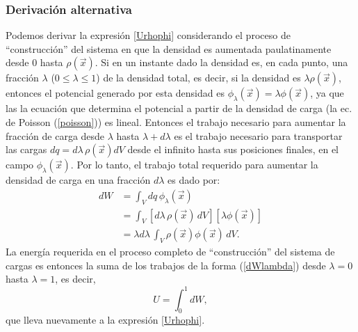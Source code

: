 \subsubsection{Derivación alternativa}
Podemos derivar la expresión \eqref{Urhophi} considerando el proceso de ``construcción'' del sistema en que la densidad es aumentada paulatinamente desde 0 hasta $\rho(\vec{x})$. Si en un instante dado la densidad es, en cada punto, una fracción $\lambda$ ($0\le\lambda\le 1$) de la densidad total, es decir, si la densidad es $\lambda\rho(\vec{x})$, entonces el potencial generado por esta densidad es $\phi_\lambda(\vec{x})=\lambda\phi(\vec{x})$, ya que las la ecuación que determina el potencial a partir de la densidad de carga (la ec. de Poisson (\ref{poisson})) es lineal. Entonces el trabajo necesario para aumentar la fracción de carga desde $\lambda$ hasta $\lambda+d\lambda$ es el trabajo necesario para transportar las cargas $dq=d\lambda\,\rho(\vec{x})dV$ desde el infinito hasta sus posiciones finales, en el campo $\phi_\lambda(\vec{x})$. Por lo tanto, el trabajo total requerido para aumentar la densidad de carga en una fracción $d\lambda$ es dado por:
\begin{align}
dW &= \int_V dq\,\phi_\lambda(\vec{x}) \\
&= \int_V \left[d\lambda\,\rho(\vec{x})\,dV\right]\left[\lambda\phi(\vec{x})\right] \\
&= \lambda d\lambda\,\int_V \rho(\vec{x})\phi(\vec{x}) \,dV . \label{dWlambda}
\end{align}
La energía requerida en el proceso completo de ``construcción'' del sistema de cargas es entonces la suma de los trabajos de la forma (\ref{dWlambda}) desde $\lambda=0$ hasta $\lambda=1$, es decir,
\begin{equation}
U=\int_0^1dW,
\end{equation}
que lleva nuevamente a la expresión \eqref{Urhophi}.

